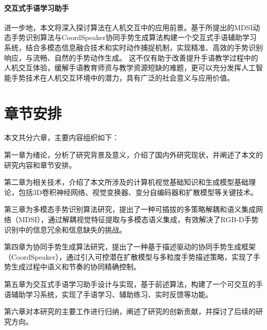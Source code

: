 \paragraph{交互式手语学习助手}
进一步地，本文将深入探讨算法在人机交互中的应用前景。基于所提出的MDSI动态手势识别算法与CoordSpeaker协同手势生成算法构建一个交互式手语辅助学习系统，结合多模态信息融合技术和实时动作捕捉机制，实现精准、高效的手势识别响应，与流畅、自然的手势动作生成。
这不仅有助于改善提升手语教学过程中的人机交互体验，缓解手语教育师资与教学资源短缺的难题\cite{2022signlearning}，更可以充分发挥人工智能手势技术在人机交互环境中的潜力，具有广泛的社会意义与应用价值。



\section{章节安排}

本文共分六章，主要内容组织如下：

第一章为绪论，分析了研究背景及意义，介绍了国内外研究现状，并阐述了本文的研究内容和章节安排。

第二章为相关技术，介绍了本文所涉及的计算机视觉基础知识和生成模型基础理论，包括3D卷积神经网络、视觉变换器、变分自编码器和扩散模型等关键技术。

第三章为多模态手势识别算法研究，提出了一种可插拔的多策略解耦和语义集成网络（MDSI），通过解耦视觉特征提取与多模态语义集成，有效解决了RGB-D手势识别中的信息冗余和信息缺失的挑战。

第四章为协同手势生成算法研究，提出了一种基于描述驱动的协同手势生成框架（CoordSpeaker），通过引入可控潜在扩散模型与多粒度手势描述策略，实现了手势生成过程中语义和节奏的协同精确控制。

第五章为交互式手语学习助手设计与实现，基于前述算法，构建了一个可交互的手语辅助学习系统，实现了手语学习、辅助练习、实时反馈等功能。

第六章对本研究的主要工作进行归纳，阐述了研究的创新贡献，并探讨了后续的研究方向。
